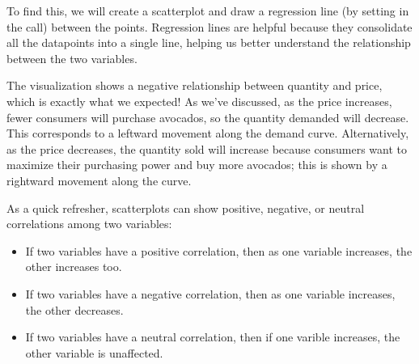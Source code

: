 \documentclass[letterpaper,10pt,english]{jupyterBook}
\begin{document}
\sphinxAtStartPar
To find this, we will create a scatterplot and draw a regression line (by setting  in the  call) between the points. Regression lines are helpful because they consolidate all the datapoints into a single line, helping us better understand the relationship between the two variables.

\begin{sphinxVerbatim}[commandchars=\\\{\}]
          
   
\end{sphinxVerbatim}

\noindent{}

\sphinxAtStartPar
The visualization shows a negative relationship between quantity and price, which is exactly what we expected! As we’ve discussed, as the price increases, fewer consumers will purchase avocados, so the quantity demanded will decrease. This corresponds to a leftward movement along the demand curve. Alternatively, as the price decreases, the quantity sold will increase because consumers want to maximize their purchasing power and buy more avocados; this is shown by a rightward movement along the curve.

\sphinxAtStartPar
As a quick refresher, scatterplots can show positive, negative, or neutral correlations among two variables:
\begin{itemize}
\item {} 
\sphinxAtStartPar
If two variables have a positive correlation, then as one variable increases, the other increases too.

\item {} 
\sphinxAtStartPar
If two variables have a negative correlation, then as one variable increases, the other decreases.

\item {} 
\sphinxAtStartPar
If two variables have a neutral correlation, then if one varible increases, the other variable is unaffected.

\end{itemize}
\end{document}

